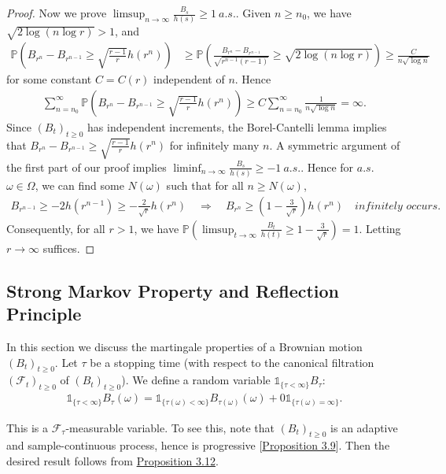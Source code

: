 \documentclass{article}
\numberwithin{equation}{section}
\renewcommand{\P}{\mathbb{P}}
\theoremstyle{plain}
\theoremstyle{definition}
\begin{document}
\begin{proof}
Now we prove $\limsup_{n\to\infty}\frac{B_s}{h(s)}\geq 1\ a.s.$. Given $n\geq n_0$, we have $\sqrt{2\log(n\log r)}>1$, and
\begin{align*}
	\P\left(B_{r^n}-B_{r^{n-1}}\geq\sqrt{\frac{r-1}{r}}h(r^n)\right) &\geq \P\left(\frac{B_{r^n}-B_{r^{n-1}}}{\sqrt{r^{n-1}(r-1)}}\geq\sqrt{2\log(n\log r)}\right)\geq \frac{C}{n\sqrt{\log n}}
\end{align*}
for some constant $C=C(r)$ independent of $n$. Hence
\begin{align*}
	\sum_{n=n_0}^\infty\P\left(B_{r^n}-B_{r^{n-1}}\geq\sqrt{\frac{r-1}{r}}h(r^n)\right)\geq C\sum_{n=n_0}^\infty\frac{1}{n\sqrt{\log n}}=\infty.
\end{align*}
Since $(B_t)_{t\geq 0}$ has independent increments, the Borel-Cantelli lemma implies that $B_{r^n}-B_{r^{n-1}}\geq\sqrt{\frac{r-1}{r}}h(r^n)$ for infinitely many $n$. A symmetric argument of the first part of our proof implies $\liminf_{n\to\infty}\frac{B_s}{h(s)}\geq -1\ a.s.$. Hence for $a.s.$ $\omega\in\Omega$, we can find some $N(\omega)$ such that for all $n\geq N(\omega)$,
\begin{align*}
	B_{r^{n-1}}\geq -2h(r^{n-1})\geq -\frac{2}{\sqrt{r}}h(r^n)\quad \Rightarrow\quad B_{r^n}\geq \left(1-\frac{3}{\sqrt{r}}\right)h(r^n)\quad\textit{infinitely occurs}.
\end{align*}
Consequently, for all $r>1$, we have $\P\left(\limsup_{t\to\infty}\frac{B_t}{h(t)}\geq 1-\frac{3}{\sqrt{r}}\right)=1$. Letting $r\to\infty$ suffices.
\end{proof}

\newpage
\subsection{Strong Markov Property and Reflection Principle}
In this section we discuss the martingale properties of a Brownian motion $(B_t)_{t\geq 0}$. Let $\tau$ be a stopping time (with respect to the canonical filtration $(\mathscr{F}_t)_{t\geq 0}$ of $(B_t)_{t\geq 0}$). We define a random variable $\mathds{1}_{\{\tau<\infty\}}B_\tau$:
\begin{align*}
	\mathds{1}_{\{\tau<\infty\}}B_{\tau}(\omega)= 
	\mathds{1}_{\{\tau(\omega)<\infty\}}B_{\tau(\omega)}(\omega)+0\mathds{1}_{\{\tau(\omega)=\infty\}}.
\end{align*}

This is a $\mathscr{F}_\tau$-measurable variable. To see this, note that $(B_t)_{t\geq 0}$ is an adaptive and sample-continuous process, hence is progressive [\hyperref[prop:3.9]{Proposition 3.9}]. Then the desired result follows from \hyperref[prop:3.12]{Proposition 3.12}.
\end{document}
